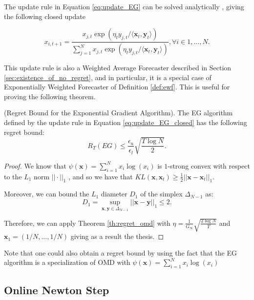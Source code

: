 The update rule in Equation \eqref{eq:update_EG} can be solved analytically \cite{helmbold1998line}, giving the following closed update 

\begin{equation}\label{eq:update_EG_closed}
x_{i,t+1}=\frac{x_{j,t}\exp\left(\eta_t{y_{j,t}}/\langle\mathbf x_t,\mathbf y_t\rangle\right)}{\sum\limits_{j=1}^Nx_{j,t}\exp\left(\eta_t{y_{j,t}}/\langle\mathbf x_t,\mathbf y_t\rangle\right)}, \forall i\in1,\ldots,N.
\end{equation}

This update rule is also a Weighted Average Forecaster described in Section \ref{sec:existence_of_no_regret}, and in particular, it is a special case of Exponentially Weighted Forecaster of Definition \ref{def:ewf}. This is useful for proving the following theorem.

\begin{theorem}(Regret Bound for the Exponential Gradient Algorithm).
The EG algorithm defined by the update rule in Equation \eqref{eq:update_EG_closed} has the following regret bound:
\begin{equation}
R_T(EG)\le \frac{\epsilon_u}{\epsilon_l}\sqrt{\frac{T\log N}{2}}.
\end{equation}
\end{theorem}

\begin{proof}
We know that $\psi(\mathbf x)=\sum\limits_{i=1}^Nx_i\log(x_i)$ is $1$-strong convex with respect to the $L_1$ norm $||\cdot||_1$ \cite{shalev2007online}, and so we have that $KL(\mathbf x,\mathbf x_t)\ge\frac{1}{2}||\mathbf x-\mathbf x_t||_1$.

Moreover, we can bound the $L_1$ diameter $D_1$ of the simplex $\Delta_{N-1}$ as: 
$$D_1=\sup\limits_{\mathbf x,\mathbf y\in\Delta_{N-1}}||\mathbf x-\mathbf y||_1\le2.$$

Therefore, we can apply Theorem \ref{th:regret_omd} with $\eta=\frac{1}{G_\infty}\sqrt{\frac{2\log N}{T}}$ and $\mathbf x_1=(1/N,\ldots,1/N)$ giving as a result the thesis.
\end{proof}

Note that one could also obtain a regret bound by using the fact that the EG algorithm is a specialization of OMD with $\psi(\mathbf x)=\sum\limits_{i=1}^N x_i\log(x_i)$ 


\subsection{Online Newton Step}

